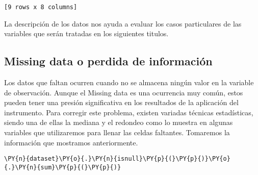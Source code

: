\begin{Verbatim}[commandchars=\\\{\}]
[9 rows x 8 columns]
    \end{Verbatim}

    La descripción de los datos nos ayuda a evaluar los casos particulares
de las variables que serán tratadas en los siguientes titulos.

    \hypertarget{missing-data}{%
\subsection{Missing data o perdida de información}\label{missing-data}}

Los datos que faltan ocurren cuando no se almacena ningún valor en la
variable de observación. Aunque el Missing data es una ocurrencia muy
común, estos pueden tener una presión significativa en los resultados de
la aplicación del instrumento. Para corregir este problema, existen
variadas técnicas estadísticas, siendo una de ellas la mediana y el
redondeo como lo muestra \cite{Bar2017} en algunas variables que
utilizaremos para llenar las celdas faltantes. Tomaremos la información
que mostramos anteriormente.

    \begin{tcolorbox}[breakable, size=fbox, boxrule=1pt, pad at break*=1mm,colback=cellbackground, colframe=cellborder]
\begin{Verbatim}[commandchars=\\\{\}]
\PY{n}{dataset}\PY{o}{.}\PY{n}{isnull}\PY{p}{(}\PY{p}{)}\PY{o}{.}\PY{n}{sum}\PY{p}{(}\PY{p}{)}
\end{Verbatim}
\end{tcolorbox}

\begin{table}[H]
\centering
\setlength{\tabcolsep}{5pt}
\caption{Missing data de variables}
\label{tab:missing data}
\end{table}
        
